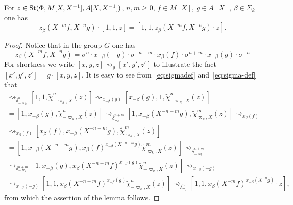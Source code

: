 \begin{lemma} \label{lem:family1}
    For $z \in \operatorname{St}(\Phi, M[X, X^{-1}], A[X, X^{-1}])$, $n, m \geq 0$, $f \in M[X]$, $g \in A[X]$, $\beta \in \Sigma_k^-$ one has
    \[ z_\beta(X^{-m}f, X^{-n}g) \cdot [1, 1, z] =  [1, 1, z_\beta(X^{-m}f, X^{-n}g) \cdot z].\]
\end{lemma}
\begin{proof}
    Notice that in the group $G$ one has
    \begin{equation} z_\beta(X^{-m}f, X^{-n}g) =
     \sigma^n \cdot x_{-\beta}(-g) \cdot \sigma^{-n-m} \cdot x_{\beta}(f) \cdot \sigma^{n + m} \cdot x_{-\beta}(g) \cdot \sigma^{-n} \end{equation}
    For shortness we write $[x, y, z] \rightsquigarrow_{g} [x', y', z']$ to illustrate the fact
     $[x', y', z'] = g \cdot [x, y, z]$.
    It is easy to see from~\eqref{eq:sigmadef} and~\eqref{eq:sigma-def} that
    \begin{multline*}
    [1, 1, z] \rightsquigarrow_{\overline{\delta}_{-\varpi_k}^n}
    [1, 1, \widetilde{\chi}^n_{-\varpi_k, X}(z)] \rightsquigarrow_{x_{-\beta}(g)}
    [x_{-\beta}(g), 1, \widetilde{\chi}_{-\varpi_k, X}^n(z)] = \\
    = [1, x_{-\beta}(g), \widetilde{\chi}^n_{-\varpi_k, X}(z)] \rightsquigarrow_{\overline{\delta}_{\varpi_k}^{n + m}}
    [1, x_{-\beta}(X^{-n-m}g), \widetilde{\chi}^m_{\varpi_k, X}(z)] \rightsquigarrow_{ x_{\beta}(f) } \\
    \rightsquigarrow_{ x_{\beta}(f) } [x_{\beta}(f), x_{-\beta}(X^{-n-m}g), \widetilde{\chi}^m_{\varpi_k, X}(z)] = \\
    = [1, x_{-\beta}(X^{-n-m}g), x_{\beta}(f)^{x_{-\beta}(X^{-n-m}g)} \widetilde{\chi}^m_{\varpi_k, X}(z)] \rightsquigarrow_{\overline{\delta}^{n + m}_{-\varpi_k}} \\
    \rightsquigarrow_{\delta_{-\varpi_k}^{n + m}} [1, x_{-\beta}(g), x_{\beta}(X^{-n-m}f)^{x_{-\beta}(g)} \widetilde{\chi}^n_{-\varpi_k, X}(z)] \rightsquigarrow_{ x_{-\beta}(-g) } \\
    \rightsquigarrow_{ x_{-\beta}(-g) } [1, 1, x_{\beta}(X^{-n-m}f)^{x_{-\beta}(g)} \widetilde{\chi}^n_{-\varpi_k, X}(z)] \rightsquigarrow_{ \overline{\delta}_{\varpi_k}^n }
    [1, 1, x_{\beta}(X^{-m}f)^{x_{-\beta}(X^{-n}g)} \cdot z],
    \end{multline*}
    from which the assertion of the lemma follows.
\end{proof}

